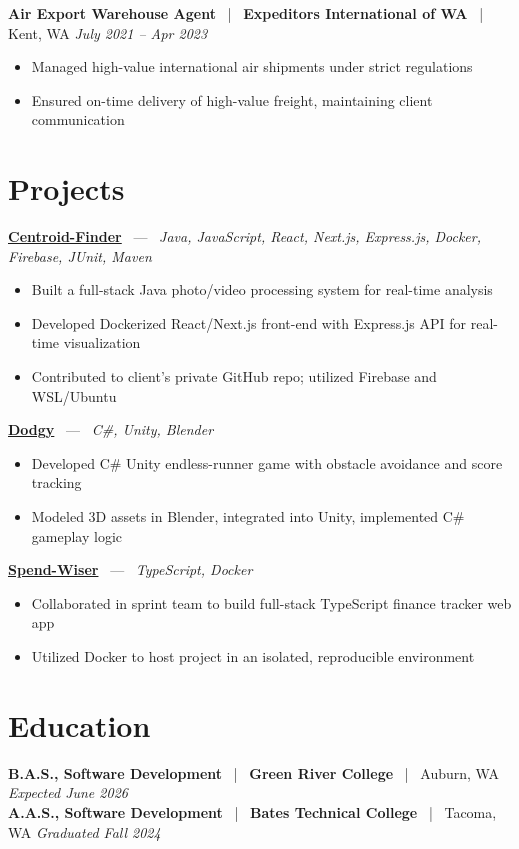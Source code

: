 \documentclass[10pt, letterpaper]{article}
\newcommand{\jobhead}[4]{%
  \vspace{5pt}%
  {\bfseries\color{dark}#1}%
  ~{\color{light}|}~%
  {\bfseries\color{navy}#2}%
  ~{\color{light}|}~%
  {\color{light}#3}%
  \hfill{\color{light}\small\textit{#4}}\\[-2pt]%
}
\newcommand{\projhead}[3]{%
  \vspace{5pt}%
  {\bfseries\color{dark}\href{#2}{#1}}%
  ~{\color{light}---}~%
  {\color{light}\small\textit{#3}}\\[-2pt]%
}
\begin{document}
\jobhead{Air Export Warehouse Agent}{Expeditors International of WA}{Kent, WA}{July 2021 – Apr 2023}
\begin{itemize}
  \item Managed high-value international air shipments under strict regulations
  \item Ensured on-time delivery of high-value freight, maintaining client communication
\end{itemize}

\section{Projects}

\projhead{Centroid-Finder}{https://github.com/xavierb117/centroid-finder}{Java, JavaScript, React, Next.js, Express.js, Docker, Firebase, JUnit, Maven}
\begin{itemize}
  \item Built a full-stack Java photo/video processing system for real-time analysis
  \item Developed Dockerized React/Next.js front-end with Express.js API for real-time visualization
  \item Contributed to client's private GitHub repo; utilized Firebase and WSL/Ubuntu
\end{itemize}

\projhead{Dodgy}{https://timyd.itch.io/dodgy}{C\#, Unity, Blender}
\begin{itemize}
  \item Developed C\# Unity endless-runner game with obstacle avoidance and score tracking
  \item Modeled 3D assets in Blender, integrated into Unity, implemented C\# gameplay logic
\end{itemize}

\projhead{Spend-Wiser}{https://github.com/JesseChum/w26-sdev372-spendwiser-finance-tracker}{TypeScript, Docker}
\begin{itemize}
  \item Collaborated in sprint team to build full-stack TypeScript finance tracker web app
  \item Utilized Docker to host project in an isolated, reproducible environment
\end{itemize}

\section{Education}

\jobhead{B.A.S., Software Development}{Green River College}{Auburn, WA}{Expected June 2026}
\jobhead{A.A.S., Software Development}{Bates Technical College}{Tacoma, WA}{Graduated Fall 2024}
\end{document}
